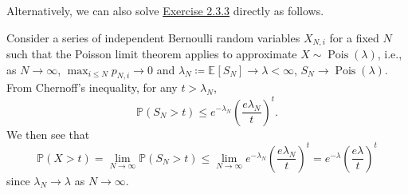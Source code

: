 Alternatively, we can also solve \hyperref[ex2.3.3]{Exercise 2.3.3} directly as follows.
\begin{answer}
	Consider a series of independent Bernoulli random variables \(X_{N, i}\) for a fixed \(N\) such that the Poisson limit theorem applies to approximate \(X \sim \operatorname{Pois}(\lambda ) \), i.e., as \(N \to \infty \), \(\max _{i \leq N} p_{N, i} \to 0\) and \(\lambda _N \coloneqq \mathbb{E}_{}\left[S_N \right] \to \lambda < \infty \), \(S_N \to \operatorname{Pois}(\lambda ) \). From Chernoff's inequality, for any \(t > \lambda _N\),
	\[
		\mathbb{P} (S_N > t) \leq e^{-\lambda _N} \left( \frac{e \lambda _N}{t} \right) ^t.
	\]
	We then see that
	\[
		\mathbb{P} (X > t)
		= \lim_{N \to \infty} \mathbb{P} (S_N > t)
		\leq \lim_{N \to \infty} e^{-\lambda _N} \left( \frac{e \lambda _N}{t} \right) ^t
		= e^{-\lambda } \left( \frac{e \lambda }{t} \right) ^t
	\]
	since \(\lambda _N \to \lambda \) as \(N \to \infty \).
\end{answer}